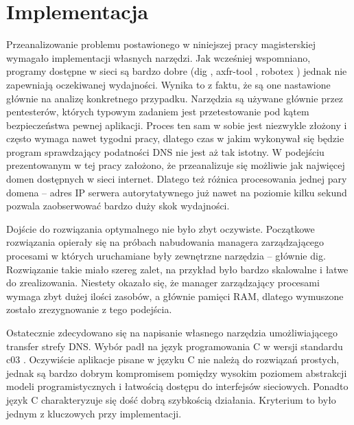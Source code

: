 \chapter{Implementacja}
Przeanalizowanie problemu postawionego w niniejszej pracy magisterskiej wymagało implementacji własnych narzędzi. Jak wcześniej wspomniano, programy dostępne w sieci są bardzo dobre (dig \cite{dig}, axfr-tool \cite{git_axfr_tool}, robotex \cite{robotex}) jednak nie zapewniają oczekiwanej wydajności. Wynika to z faktu, że są one nastawione głównie na analizę konkretnego przypadku. Narzędzia są używane głównie przez pentesterów, których typowym zadaniem jest przetestowanie pod kątem bezpieczeństwa pewnej aplikacji. Proces ten sam w sobie jest niezwykle złożony i często wymaga nawet tygodni pracy, dlatego czas w jakim wykonywał się będzie program sprawdzający podatności DNS nie jest aż tak istotny. W podejściu prezentowanym w tej pracy założono, że przeanalizuje się możliwie jak najwięcej domen dostępnych w sieci internet. Dlatego też różnica procesowania jednej pary domena -- adres IP serwera autorytatywnego już nawet na poziomie kilku sekund pozwala zaobserwować bardzo duży skok wydajności. 

Dojście do rozwiązania optymalnego nie było zbyt oczywiste. Początkowe rozwiązania opierały się na próbach nabudowania managera zarządzającego procesami w których uruchamiane były zewnętrzne narzędzia -- głównie dig. Rozwiązanie takie miało szereg zalet, na przykład było bardzo skalowalne i łatwe do zrealizowania. Niestety okazało się, że manager zarządzający procesami wymaga zbyt dużej ilości zasobów, a głównie pamięci RAM, dlatego wymuszone zostało zrezygnowanie z tego podejścia. 

Ostatecznie zdecydowano się na napisanie własnego narzędzia umożliwiającego transfer strefy DNS. Wybór padł na język programowania C \cite{clanguage} w wersji standardu c03 \cite{c03std}. Oczywiście aplikacje pisane w języku C nie należą do rozwiązań prostych, jednak są bardzo dobrym kompromisem pomiędzy wysokim poziomem abstrakcji modeli programistycznych i łatwością dostępu do interfejsów sieciowych. Ponadto język C charakteryzuje się dość dobrą szybkością działania. Kryterium to było jednym z kluczowych przy implementacji.

